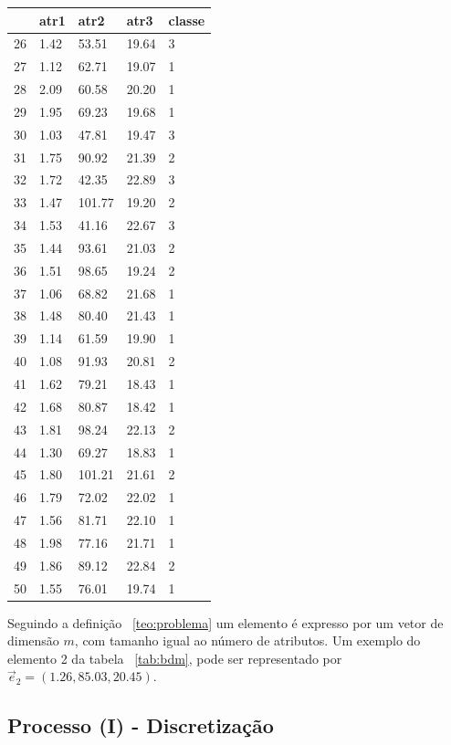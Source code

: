 \begin{table}[!ht]
\begin{tabular}{ |lllll| }
\hline
  & atr1 & atr2 & atr3 & classe \\ \hline
26 & 1.42 & 53.51 & 19.64 & 3 \\ \hline
27 & 1.12 & 62.71 & 19.07 & 1 \\ \hline
28 & 2.09 & 60.58 & 20.20 & 1 \\ \hline
29 & 1.95 & 69.23 & 19.68 & 1 \\ \hline
30 & 1.03 & 47.81 & 19.47 & 3 \\ \hline
31 & 1.75 & 90.92 & 21.39 & 2 \\ \hline
32 & 1.72 & 42.35 & 22.89 & 3 \\ \hline
33 & 1.47 & 101.77 & 19.20 & 2 \\ \hline
34 & 1.53 & 41.16 & 22.67 & 3 \\ \hline
35 & 1.44 & 93.61 & 21.03 & 2 \\ \hline
36 & 1.51 & 98.65 & 19.24 & 2 \\ \hline
37 & 1.06 & 68.82 & 21.68 & 1 \\ \hline
38 & 1.48 & 80.40 & 21.43 & 1 \\ \hline
39 & 1.14 & 61.59 & 19.90 & 1 \\ \hline
40 & 1.08 & 91.93 & 20.81 & 2 \\ \hline
41 & 1.62 & 79.21 & 18.43 & 1 \\ \hline
42 & 1.68 & 80.87 & 18.42 & 1 \\ \hline
43 & 1.81 & 98.24 & 22.13 & 2 \\ \hline
44 & 1.30 & 69.27 & 18.83 & 1 \\ \hline
45 & 1.80 & 101.21 & 21.61 & 2 \\ \hline
46 & 1.79 & 72.02 & 22.02 & 1 \\ \hline
47 & 1.56 & 81.71 & 22.10 & 1 \\ \hline
48 & 1.98 & 77.16 & 21.71 & 1 \\ \hline
49 & 1.86 & 89.12 & 22.84 & 2 \\ \hline
50 & 1.55 & 76.01 & 19.74 & 1 \\ \hline
\end{tabular}
\end{table}

Seguindo a definição ~\ref{teo:problema} um elemento é expresso por um vetor  de dimensão ${m}$, com tamanho igual ao número de atributos. Um exemplo do elemento 2 da tabela ~\ref{tab:bdm}, pode ser representado por ${\vec{e}_{2}=(1.26,85.03, 20.45)}$.

\subsection{Processo (I) - Discretização} \label{cap:ferramentas:ssec:disc}

